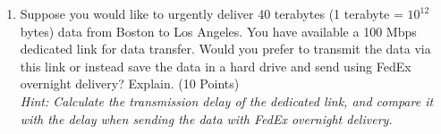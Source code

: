 \documentclass[12pt]{article}
\begin{document}
\begin{enumerate}
    \item Suppose you would like to urgently deliver 40 terabytes (1 terabyte = \( 10^{12} \) bytes) data
    from Boston to Los Angeles. You have available a 100 Mbps dedicated link for data
    transfer. Would you prefer to transmit the data via this link or instead save the data in a
    hard drive and send using FedEx overnight delivery? Explain. (10 Points) \\
    \textit{Hint: Calculate the transmission delay of the dedicated link, and compare it with the delay
    when sending the data with FedEx overnight delivery.} \\\\ \answerSeven
    
\end{enumerate}
\end{document}
